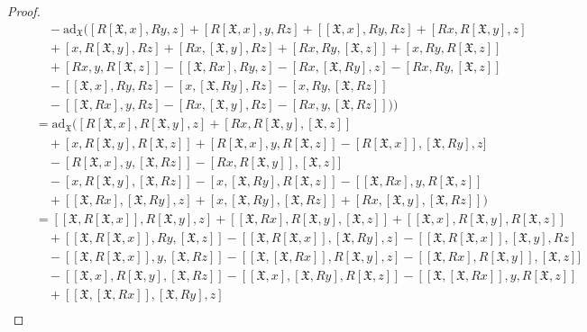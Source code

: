 \documentclass[10pt,a4paper]{amsart}
\begin{document}
\begin{proof}
\begin{align*}
\quad&\quad-\mathrm{ad}_\mathfrak{X}([R[\mathfrak{X}, x], Ry, z]+[R[\mathfrak{X}, x], y, Rz]+[[\mathfrak{X}, x], Ry, Rz]+[Rx, R[\mathfrak{X}, y], z]\\
\quad&\quad+[x, R[\mathfrak{X}, y], Rz]+[Rx, [\mathfrak{X}, y], Rz]+[Rx, Ry, [\mathfrak{X}, z]]+[x, Ry, R[\mathfrak{X}, z]]\\
\quad&\quad +[Rx, y, R[\mathfrak{X}, z]]-[[\mathfrak{X},Rx], Ry, z] -[Rx, [\mathfrak{X},Ry], z]-[Rx, Ry, [\mathfrak{X},z]]\\
\quad&\quad-[[\mathfrak{X}, x], Ry, Rz]-[x, [\mathfrak{X}, Ry], Rz]-[x, Ry, [\mathfrak{X}, Rz]]\\
\quad&\quad-[[\mathfrak{X},Rx], y, Rz]-[Rx, [\mathfrak{X},y], Rz]-[Rx, y, [\mathfrak{X},Rz]])\Big)\\
&=\mathrm{ad}_\mathfrak{X}\Big( [R[\mathfrak{X}, x], R[\mathfrak{X}, y], z]+[Rx, R[\mathfrak{X}, y], [\mathfrak{X}, z]]\\
\quad&\quad+[x, R[\mathfrak{X}, y], R[\mathfrak{X}, z]]+[R[\mathfrak{X}, x], y, R[\mathfrak{X}, z]]-[ R[\mathfrak{X}, x]],[\mathfrak{X}, Ry], z]\\
\quad&\quad-[R[\mathfrak{X}, x], y, [\mathfrak{X}, Rz]]-[Rx, R[\mathfrak{X}, y]], [\mathfrak{X},z]]\\
\quad&\quad-[ x, R[\mathfrak{X}, y], [\mathfrak{X},Rz]]-[ x, [\mathfrak{X},Ry], R[\mathfrak{X}, z]]-[ [\mathfrak{X},Rx], y, R[\mathfrak{X}, z]]\\
\quad&\quad+[ [\mathfrak{X},Rx], [\mathfrak{X}, Ry], z]+[x,[\mathfrak{X}, Ry], [\mathfrak{X}, Rz]]+[Rx, [\mathfrak{X},y], [\mathfrak{X},Rz]]\Big)\\
&=[[\mathfrak{X},R[\mathfrak{X}, x]], R[\mathfrak{X}, y], z]+[[\mathfrak{X},Rx], R[\mathfrak{X}, y], [\mathfrak{X}, z]]+[[\mathfrak{X}, x], R[\mathfrak{X}, y], R[\mathfrak{X}, z]]\\
&\quad+[[\mathfrak{X}, R[\mathfrak{X}, x]], Ry, [\mathfrak{X}, z]]-[ [\mathfrak{X}, R[\mathfrak{X}, x]],[\mathfrak{X}, Ry], z]-[[\mathfrak{X}, R[\mathfrak{X}, x]],[\mathfrak{X}, y], Rz]\\
&\quad-[[\mathfrak{X}, R[\mathfrak{X}, x]], y, [\mathfrak{X}, Rz]]-[[\mathfrak{X}, [\mathfrak{X}, Rx]], R[\mathfrak{X}, y], z]-[[\mathfrak{X}, Rx], R[\mathfrak{X}, y]], [\mathfrak{X},z]]\\
&\quad-[[\mathfrak{X}, x], R[\mathfrak{X}, y], [\mathfrak{X},Rz]]-[[\mathfrak{X}, x], [\mathfrak{X},Ry], R[\mathfrak{X}, z]]-[[\mathfrak{X}, [\mathfrak{X},Rx]], y, R[\mathfrak{X}, z]]\\
&\quad+[[\mathfrak{X}, [\mathfrak{X},Rx]], [\mathfrak{X}, Ry], z]\\

\end{align*}
\end{proof}
\end{document}
